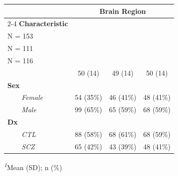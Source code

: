 \begin{table}[t]
\fontsize{12.0pt}{14.0pt}\selectfont
\begin{tabular*}{\linewidth}{@{\extracolsep{\fill}}lccc}
\toprule
 & \multicolumn{3}{c}{\textbf{Brain Region}} \\ 
\cmidrule(lr){2-4}
\textbf{Characteristic} & \shortstack[l]{\textbf{Caudate} \\N = 153}\textsuperscript{\textit{1}} & \shortstack[l]{\textbf{DLPFC} \\N = 111}\textsuperscript{\textit{1}} & \shortstack[l]{\textbf{Hippocampus} \\N = 116}\textsuperscript{\textit{1}} \\ 
\midrule\addlinespace[2.5pt]
{\bfseries Age} & 50 (14) & 49 (14) & 50 (14) \\ 
{\bfseries Sex} &  &  &  \\ 
{\itshape     Female} & 54 (35\%) & 46 (41\%) & 48 (41\%) \\ 
{\itshape     Male} & 99 (65\%) & 65 (59\%) & 68 (59\%) \\ 
{\bfseries Dx} &  &  &  \\ 
{\itshape     CTL} & 88 (58\%) & 68 (61\%) & 68 (59\%) \\ 
{\itshape     SCZ} & 65 (42\%) & 43 (39\%) & 48 (41\%) \\ 
\bottomrule
\end{tabular*}
\begin{minipage}{\linewidth}
\textsuperscript{\textit{1}}Mean (SD); n (\%)\\
\end{minipage}
\end{table}

